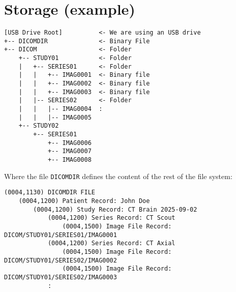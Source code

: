 \section{Storage (example)}
\begin{verbatim}
[USB Drive Root]          <- We are using an USB drive
+-- DICOMDIR              <- Binary File
+-- DICOM                 <- Folder
    +-- STUDY01           <- Folder
    |   +-- SERIES01      <- Folder
    |   |   +-- IMAG0001  <- Binary file
    |   |   +-- IMAG0002  <- Binary file
    |   |   +-- IMAG0003  <- Binary file
    |   |-- SERIES02      <- Folder
    |   |   |-- IMAG0004  :
    |   |   |-- IMAG0005
    +-- STUDY02
        +-- SERIES01
            +-- IMAG0006
            +-- IMAG0007
            +-- IMAG0008
\end{verbatim}

Where the file \texttt{DICOMDIR} defines the content of the rest of the file system:

\begin{verbatim}
(0004,1130) DICOMDIR FILE
    (0004,1200) Patient Record: John Doe
        (0004,1200) Study Record: CT Brain 2025-09-02
            (0004,1200) Series Record: CT Scout
                (0004,1500) Image File Record: DICOM/STUDY01/SERIES01/IMAG0001
            (0004,1200) Series Record: CT Axial
                (0004,1500) Image File Record: DICOM/STUDY01/SERIES02/IMAG0002
                (0004,1500) Image File Record: DICOM/STUDY01/SERIES02/IMAG0003
            :
\end{verbatim}
